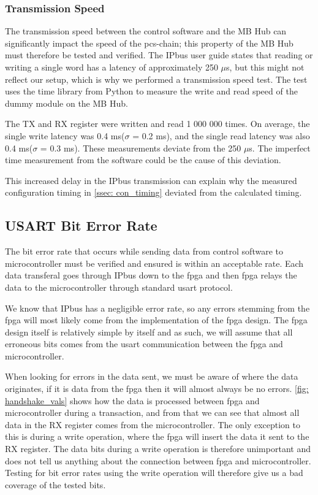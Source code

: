 \documentclass[main.tex]{subfiles}
\begin{document}
\subsubsection{Transmission Speed}

The transmission speed between the control software and the MB Hub can significantly impact the speed of the \gls{pcs}-chain; this property of the MB Hub must therefore be tested and verified. The IPbus user guide states that reading or writing a single word has a latency of approximately 250 $\mu$s\cite{ipbus_guide}, but this might not reflect our setup, which is why we performed a transmission speed test. The test uses the time library from Python to measure the write and read speed of the dummy module on the MB Hub.

The TX and RX register were written and read 1 000 000 times. On average, the single write latency was 0.4 ms($\sigma$ = 0.2 ms), and the single read latency was also 0.4 ms($\sigma$ = 0.3 ms). These measurements deviate from the 250 $\mu$s. The imperfect time measurement from the software could be the cause of this deviation.

This increased delay in the IPbus transmission can explain why the measured configuration timing in \autoref{ssec: con_timing} deviated from the calculated timing. 

\subsection{USART Bit Error Rate}

\label{ssec: bit_error}
The bit error rate that occurs while sending data from control software to microcontroller must be verified and ensured is within an acceptable rate. Each data transferal goes through IPbus down to the \gls{fpga} and then \gls{fpga} relays the data to the microcontroller through standard \gls{usart} protocol.

We know that IPbus has a negligible error rate\cite{IPbus}, so any errors stemming from the \gls{fpga} will most likely come from the implementation of the \gls{fpga} design. The \gls{fpga} design itself is relatively simple by itself and as such, we will assume that all erroneous bits comes from the \gls{usart} communication between the \gls{fpga} and microcontroller.

When looking for errors in the data sent, we must be aware of where the data originates, if it is data from the \gls{fpga} then it will almost always be no errors. \autoref{fig: handshake_vals} shows how the data is processed between \gls{fpga} and microcontroller during a transaction, and from that we can see that almost all data in the RX register comes from the microcontroller. The only exception to this is during a write operation, where the \gls{fpga} will insert the data it sent to the RX register. The data bits during a write operation is therefore unimportant and does not tell us anything about the connection between \gls{fpga} and microcontroller. Testing for bit error rates using the write operation will therefore give us a bad coverage of the tested bits.
\end{document}
